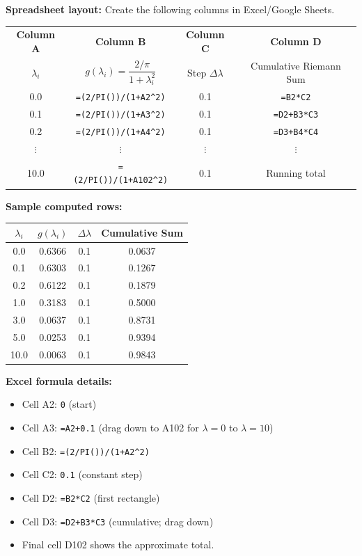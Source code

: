 \documentclass[12pt,a4paper]{article}
\begin{document}
\textbf{Spreadsheet layout:} Create the following columns in Excel/Google Sheets.

\begin{center}
\begin{tabular}{cccc}
\toprule
\textbf{Column A} & \textbf{Column B} & \textbf{Column C} & \textbf{Column D} \\
$\lambda_i$ & $g(\lambda_i)=\dfrac{2/\pi}{1+\lambda_i^2}$ & Step $\Delta\lambda$ & Cumulative Riemann Sum \\
\midrule
0.0 & \texttt{=(2/PI())/(1+A2\^{}2)} & 0.1 & \texttt{=B2*C2} \\
0.1 & \texttt{=(2/PI())/(1+A3\^{}2)} & 0.1 & \texttt{=D2+B3*C3} \\
0.2 & \texttt{=(2/PI())/(1+A4\^{}2)} & 0.1 & \texttt{=D3+B4*C4} \\
$\vdots$ & $\vdots$ & $\vdots$ & $\vdots$ \\
10.0 & \texttt{=(2/PI())/(1+A102\^{}2)} & 0.1 & Running total \\
\bottomrule
\end{tabular}
\end{center}

\textbf{Sample computed rows:}

\begin{center}
\begin{tabular}{cccc}
\toprule
$\lambda_i$ & $g(\lambda_i)$ & $\Delta\lambda$ & Cumulative Sum \\
\midrule
0.0 & 0.6366 & 0.1 & 0.0637 \\
0.1 & 0.6303 & 0.1 & 0.1267 \\
0.2 & 0.6122 & 0.1 & 0.1879 \\
1.0 & 0.3183 & 0.1 & 0.5000 \\
3.0 & 0.0637 & 0.1 & 0.8731 \\
5.0 & 0.0253 & 0.1 & 0.9394 \\
10.0 & 0.0063 & 0.1 & 0.9843 \\
\bottomrule
\end{tabular}
\end{center}

\textbf{Excel formula details:}
\begin{itemize}
  \item Cell A2: \texttt{0} (start)
  \item Cell A3: \texttt{=A2+0.1} (drag down to A102 for $\lambda=0$ to $\lambda=10$)
  \item Cell B2: \texttt{=(2/PI())/(1+A2\^{}2)}
  \item Cell C2: \texttt{0.1} (constant step)
  \item Cell D2: \texttt{=B2*C2} (first rectangle)
  \item Cell D3: \texttt{=D2+B3*C3} (cumulative; drag down)
  \item Final cell D102 shows the approximate total.
\end{itemize}
\end{document}
